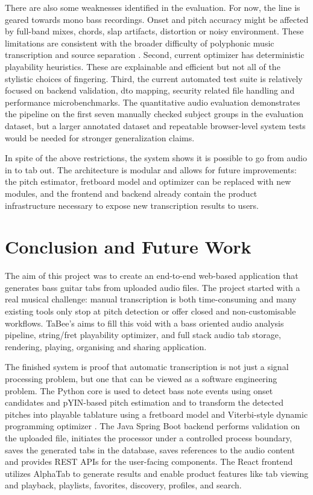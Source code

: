 \documentclass[a4paper, 12pt, titlepage]{article}
\begin{document}
There are also some weaknesses identified in the evaluation. For now, the line is geared towards mono bass recordings. Onset and pitch accuracy might be affected by full-band mixes, chords, slap artifacts, distortion or noisy environment. These limitations are consistent with the broader difficulty of polyphonic music transcription and source separation \cite{benetos2013,smaragdis2003,virtanen2007}. Second, current optimizer has deterministic playability heuristics. These are explainable and efficient but not all of the stylistic choices of fingering. Third, the current automated test suite is relatively focused on backend validation, dto mapping, security related file handling and performance microbenchmarks. The quantitative audio evaluation demonstrates the pipeline on the first seven manually checked subject groups in the evaluation dataset, but a larger annotated dataset and repeatable browser-level system tests would be needed for stronger generalization claims.

In spite of the above restrictions, the system shows it is possible to go from audio in to tab out. The architecture is modular and allows for future improvements: the pitch estimator, fretboard model and optimizer can be replaced with new modules, and the frontend and backend already contain the product infrastructure necessary to expose new transcription results to users.

\section{Conclusion and Future Work}
\label{sec:conclusion}

The aim of this project was to create an end-to-end web-based application that generates bass guitar tabs from uploaded audio files. The project started with a real musical challenge: manual transcription is both time-consuming and many existing tools only stop at pitch detection or offer closed and non-customisable workflows. TaBee's aims to fill this void with a bass oriented audio analysis pipeline, string/fret playability optimizer, and full stack audio tab storage, rendering, playing, organising and sharing application.

The finished system is proof that automatic transcription is not just a signal processing problem, but one that can be viewed as a software engineering problem. The Python core is used to detect bass note events using onset candidates and pYIN-based pitch estimation and to transform the detected pitches into playable tablature using a fretboard model and Viterbi-style dynamic programming optimizer \cite{bello2005,mauch2014,forney1973}. The Java Spring Boot backend performs validation on the uploaded file, initiates the processor under a controlled process boundary, saves the generated tabs in the database, saves references to the audio content and provides REST APIs for the user-facing components. The React frontend utilizes AlphaTab to generate results and enable product features like tab viewing and playback, playlists, favorites, discovery, profiles, and search.
\end{document}
